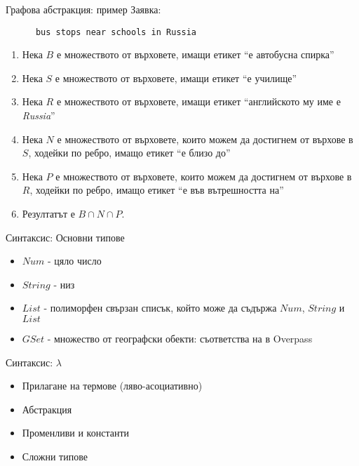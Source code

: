 \documentclass[10pt]{beamer}
\begin{document}
  \begin{frame}[fragile]{Графова абстракция: пример}
    Заявка:
    \begin{lstwrap}\begin{lstlisting}
      bus stops near schools in Russia
    \end{lstlisting}\end{lstwrap}

    \begin{enumerate}
      \item Нека $B$ е множеството от върховете, имащи етикет
        ``е автобусна спирка''
      \item Нека $S$ е множеството от върховете, имащи етикет
        ``е училище''
      \item Нека $R$ е множеството от върховете, имащи етикет
        ``английското му име е \emph{Russia}''
      \item Нека $N$ е множеството от върховете, които можем да
        достигнем от върхове в $S$, ходейки по ребро, имащо етикет
        ``е близо до''
      \item Нека $P$ е множеството от върховете, които можем да
        достигнем от върхове в $R$, ходейки по ребро, имащо етикет
        ``е във вътрешността на''
      \item Резултатът е $B \cap N \cap P$.
    \end{enumerate}
  \end{frame}

  \begin{frame}{Синтаксис: Основни типове}
    \begin{itemize}
      \item $Num$ - цяло число \pika
      \item $String$ - низ \pika
      \item $List$ - полиморфен свързан списък, който може
        да съдържа $Num$, $String$ и $List$
      \item $GSet$ - множество от географски обекти: съответства на 
        в Overpass
    \end{itemize}
  \end{frame}

  \begin{frame}{Синтаксис: $\lambda$}
    \begin{itemize}
      \item Прилагане на термове (ляво-асоциативно)
        \begin{center}
        \end{center}
      \item Абстракция
        \begin{center}
        \end{center}
      \item Променливи и константи
      \item Сложни типове
        \begin{center}
        \end{center}
    \end{itemize}
  \end{frame}
\end{document}
